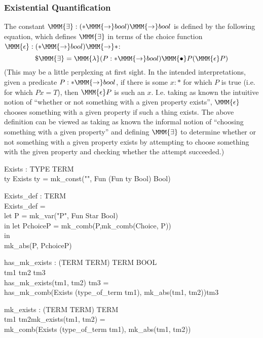 \documentclass[a4paper,11pt,titlepage]{article}
\begin{document}
\begin{titlepage}
\subsubsection{Existential Quantification}
The constant $\MMM{\exists} : (* \MMM{\rightarrow} bool) \MMM{\rightarrow} bool$ is defined
by the following equation, which defines $\MMM{\exists}$ in terms
of the choice function $\MMM{\epsilon}: (* \MMM{\rightarrow} bool) \MMM{\rightarrow}*$:
$$\$\MMM{\exists} = \MMM{\lambda}(P : * \MMM{\rightarrow} bool) \MMM{\bullet} P(\MMM{\epsilon}P)$$
(This may be a little perplexing at first sight.
In the intended interpretations, given a predicate
$P : * \MMM{\rightarrow} bool$, if there is some $x : *$ for which $P$
is true (i.e. for which $P x = T$), then $\MMM{\epsilon} P$ is such
an $x$. I.e. taking as known the intuitive notion of
``whether or not something with a given property exists'',
$\MMM{\epsilon}$ chooses
something with a given property if such a thing exists.
The above definition can be viewed as taking as known
the informal notion of ``choosing something with a given
property'' and defining $\MMM{\exists}$ to determine
whether or not something with a given property exists
by attempting to choose something with the given property and checking whether the attempt succeeded.)
\begin{HOLConst}
\+	\PrNL{}Exists\PrNN{} : TYPE \MMM{\rightarrow} TERM\\
\PrPH{}
\+	\MMM{\forall} ty \MMM{\bullet} Exists ty = mk\_const("\MMM{\exists}", Fun (Fun ty Bool) Bool)\\
\end{HOLConst}

\begin{HOLConst}
\+	\PrNL{}Exists\_def\PrNN{} : TERM\\
\PrPH{}
\+	Exists\_def =\\
\+	let P = mk\_var("P", Fun Star Bool)\\
\+	in let PchoiceP = mk\_comb(P,mk\_comb(Choice, P))\\
\+	in\\
\+	mk\_abs(P, PchoiceP)\\
\end{HOLConst}
\begin{HOLConst}
\+	\PrNL{}has\_mk\_exists\PrNN{} : (TERM \MMM{\times} TERM) \MMM{\rightarrow} TERM \MMM{\rightarrow} BOOL\\
\PrPH{}
\+	\MMM{\forall} tm1 tm2 tm3 \MMM{\bullet}\\
\+	has\_mk\_exists(tm1, tm2) tm3 =\\
\+	has\_mk\_comb(Exists (type\_of\_term tm1), mk\_abs(tm1, tm2))tm3\\
\end{HOLConst}
\begin{HOLConst}
\+	\PrNL{}mk\_exists\PrNN{} : (TERM \MMM{\times} TERM) \MMM{\rightarrow} TERM\\
\PrPH{}
\+	\MMM{\forall} tm1 tm2\MMM{\bullet}mk\_exists(tm1, tm2) =\\
\+			mk\_comb(Exists (type\_of\_term tm1), mk\_abs(tm1, tm2))\\
\end{HOLConst}

\end{titlepage}
\end{document}
